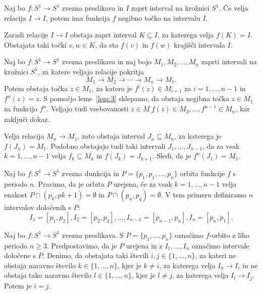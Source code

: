 \documentclass[../TG_magistrsko_delo_sections.tex]{subfiles}
\begin{document}
\begin{lema}\label{lem:3}		%
Naj bo $f : S^1 \to S^1$ zvezna preslikava in $I$ zaprt interval na krožnici $S^1$. Če velja relacija $I \to I$, potem ima funkcija $f$ negibno točko na intervalu $I$.
\end{lema}

\begin{dokaz}
Zaradi relacije $I \to I$ obstaja zaprt interval $K \subseteq I$, za katerega velja $f(K) = I$. Obstajata taki točki $v, w \in K$, da sta $f(v)$ in $f(w)$ krajišči intervala $I$.
\end{dokaz}

\begin{lema}\label{lem:4}				%
Naj bo $f : S^1 \to S^1$ zvezna preslikava in naj bojo $M_1, M_2, \dots, M_n$ zaprti intervali na krožnici $S^1$, za katere veljajo relacije pokritja 
$$M_1 \to M_2 \to \cdots \to M_n \to M_1.$$ 
Potem obstaja točka $z \in M_1$, za katero je $f^i(z) \in M_{i+1}$ za $i = 1, \dots, n-1$ in $f^n(z) =z$. S pomočjo leme~\ref{lem:3} sklepamo, da obstaja negibna točka $z \in M_1$ za funkcijo $f^n$. Veljajo tudi vsebovanosti $z \in M_, f(z) \in M_2, \dots, f^{n-1} \in M_n$, kar zaključi dokaz.
\end{lema}

\begin{dokaz}
Velja relacija $M_n \to M_1$, zato obstaja interval $J_n \subseteq M_n$, za katerega je $f(J_n) = M_1$. Podobno obstajajo tudi taki intervali $J_1, \dots, J_{n-1}$, da za vsak $k = 1, \dots, n-1$ velja $f_k \subseteq M_k$ in $f(J_k) = J_{k+1}$. Sledi, da je $f^n(J_1) = M_1$. 
\end{dokaz}

\begin{definicija}
Naj bo $f: S^1 \to S^1$ zvezna dunkcija in $P =\{p_1, p_1, \dots, p_n \}$ orbita funkcije $f$ s periodo $n$. Pravimo, da je orbita $P$ urejena, če za vsak $k=1, \dots, n-1$ velja enakost $P \cap (p_k, p{k+1}) = \emptyset$ in $P \cap (p_n, p_q) = \emptyset$. V tem primeru definiramo $n$ intervalov določenih s $P$:
$$I_1 = [p_1, p_2], I_2 = [p_2, p_3], \dots, I_{n-1} = [p_{n-1}, p_n], I_n = [p_n, p_1].$$
\end{definicija}

\begin{lema}\label{lem:5}					%
Naj bo $f : S^1 \to S^1$ zvezna preslikava. S $P=\{p_1, \dots, p_n\}$ označimo $f$-orbito z liho periodo $n \geq 3$. Predpostavimo, da je $P$ urejena in z $I_1, \dots, I_n$ označimo intervale določene s $P$. Denimo, da obstajata taki števili $i, j \in \{1, \dots, n \}$, za kateri ne obstaja naravno število $k \in \{1, \dots, n\}$, kjer je $k \neq i$, za katerega velja $I_k \to I_i$ in ne obstaja tako naravno število $l \in \{1, \dots, n\}$, kjer je $l \neq j$, za katerega velja $I_l \to I_j$. Potem je $i=j$.
\end{lema}
\end{document}
